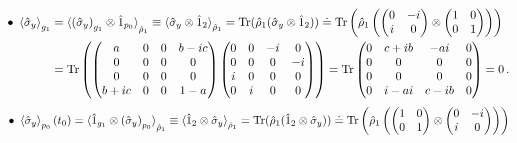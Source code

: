 \documentclass[11pt]{article}
\numberwithin{equation}{section} %
\numberwithin{figure}{section} %
\begin{document}
\begin{appendices}
\begin{equation}
\begin{split}
\end{split}
\end{equation}
\begin{equation} \label{sigmay_otimes_one_appendix}
\begin{split}
 \bullet\,\,\braket{\hat{\sigma}_y}_{g_1}
 &= \braket{ \left(\hat{\sigma}_y\right)_{g_1}\otimes \hat{1}_{p_0}}_{\hat{\rho}_1} \equiv\braket{\hat{\sigma}_y\otimes\hat{1}_2}_{\hat{\rho}_1}=\textrm{Tr}(\hat{\rho}_{1}(\hat{\sigma}_y\otimes\hat{1}_2))\doteq \textrm{Tr}\begin{pmatrix}\hat{\rho}_{1}\begin{pmatrix}\begin{pmatrix}0&-i\\i&0\end{pmatrix}\otimes\begin{pmatrix}1&0\\0&1\end{pmatrix}\end{pmatrix}\end{pmatrix}\\
 &=\textrm{Tr}\begin{pmatrix}\begin{pmatrix}a&0&0&b-ic\\0&0&0&0\\0&0&0&0\\b+ic&0&0&1-a\end{pmatrix}\begin{pmatrix}0&0&-i&0\\0&0&0&-i\\i&0&0&0\\0&i&0&0\end{pmatrix}\end{pmatrix}=\textrm{Tr}\begin{pmatrix}0&c+ib&-ai&0\\0&0&0&0\\0&0&0&0\\0&i-ai&c-ib&0\end{pmatrix}=0\,\textrm{.}
\end{split}
\end{equation}
\begin{equation} \label{sigmay_otimes_one_appendix2}
\begin{split}
 \bullet\,\,\braket{\hat{\sigma}_y}_{p_0}(t_0)
 &=\braket{\hat{1}_{g_1}\otimes\left(\hat{\sigma}_y\right)_{p_0}}_{\hat{\rho}_1} \equiv\braket{\hat{1}_2\otimes\hat{\sigma}_y}_{\hat{\rho}_1}=\textrm{Tr}(\hat{\rho}_{1}(\hat{1}_2\otimes\hat{\sigma}_y))\doteq \textrm{Tr}\begin{pmatrix}\hat{\rho}_{1}\begin{pmatrix}\begin{pmatrix}1&0\\0&1\end{pmatrix}\otimes\begin{pmatrix}0&-i\\i&0\end{pmatrix}\end{pmatrix}\end{pmatrix}\\

\end{split}
\end{equation}
\end{appendices}
\end{document}

